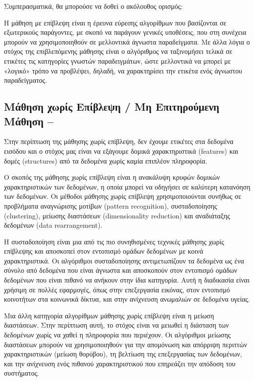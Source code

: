 Συμπερασματικά, θα μπορούσε να δοθεί ο ακόλουθος ορισμός:

Η μάθηση με επίβλεψη είναι η έρευνα εύρεσης αλγορίθμων που βασίζονται σε εξωτερικούς παράγοντες, με σκοπό να παράγουν γενικές υποθέσεις, που στη συνέχεια μπορούν να χρησιμοποιηθούν σε μελλοντικά άγνωστα παραδείγματα. Με άλλα λόγια ο στόχος της επιβλεπόμενης μάθησης είναι ο αλγόριθμος να ταξινομήσει τελικά σε ετικέτες τις κατηγορίες γνωστών παραδειγμάτων, ώστε μελλοντικά να μπορεί με «λογικό» τρόπο να προβλέψει, δηλαδή, να χαρακτηρίσει την ετικέτα ενός άγνωστου παραδείγματος. \cite{3.12}


\subsection{Μάθηση χωρίς Επίβλεψη / Μη Επιτηρούμενη Μάθηση – }
Στην περίπτωση της μάθησης χωρίς επίβλεψη, δεν έχουμε ετικέτες στα δεδομένα εισόδου και ο στόχος μας είναι να εξάγουμε δομικά χαρακτηριστικά (features) και δομές (structures) από τα δεδομένα χωρίς καμία επιπλέον πληροφορία.

Ο σκοπός της μάθησης χωρίς επίβλεψη είναι η ανακάλυψη κρυφών δομικών χαρακτηριστικών των δεδομένων, η οποία μπορεί να οδηγήσει σε καλύτερη κατανόηση των δεδομένων. Οι μέθοδοι μάθησης χωρίς επίβλεψη χρησιμοποιούνται συνήθως σε προβλήματα αναγνώρισης μοτίβων (pattern recognition), συσταδοποίησης (clustering), μείωσης διαστάσεων (dimensionality reduction) και αναδιάταξης δεδομένων (data rearrangement).

Η συσταδοποίηση είναι μια από τις πιο συνηθισμένες τεχνικές μάθησης χωρίς επίβλεψης και αποσκοπεί στον εντοπισμό ομάδων δεδομένων με κοινά χαρακτηριστικά. Οι αλγόριθμοι συσταδοποίησης αντιμετωπίζουν τα δεδομένα ως ένα σύνολο από δεδομένα που είναι άγνωστα και αποσκοπούν στον εντοπισμό ομάδων δεδομένων που είναι πιθανό να ανήκουν στην ίδια κατηγορία. Αυτή η διαδικασία είναι χρήσιμη σε πολλές εφαρμογές, όπως στην επεξεργασία εικόνας, στον εντοπισμό κοινοτήτων στα κοινωνικά δίκτυα, και στην ανίχνευση ανωμαλιών σε δεδομένα υγείας.

Μια άλλη κατηγορία αλγορίθμων μάθησης χωρίς επίβλεψη είναι η μείωση διαστάσεων. Στην περίπτωση αυτή, το στόχος είναι να μειωθεί η διάσταση των δεδομένων χωρίς να χαθεί η πληροφορία που περιέχουν. Οι αλγόριθμοι μείωσης διαστάσεων μπορούν να χρησιμοποιηθούν για την απομόνωση και απόρριψη περιττών χαρακτηριστικών (μείωση θορύβου), τη βελτίωση της επεξεργασίας των δεδομένων, και την ανίχνευση ενός πιθανού χαρακτηριστικού που επηρεάζει την απόδοση του συστήματος.

